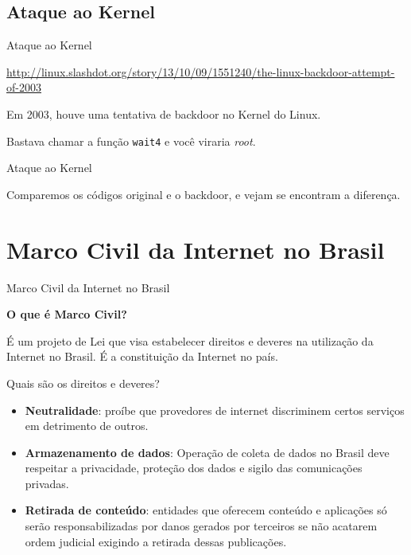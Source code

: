 \begin{frame}


\end{frame}

\subsection{Ataque ao Kernel}\label{ataque-ao-kernel}

\begin{frame}{Ataque ao Kernel}

\url{http://linux.slashdot.org/story/13/10/09/1551240/the-linux-backdoor-attempt-of-2003}

Em 2003, houve uma tentativa de backdoor no Kernel do Linux.


Bastava chamar a função \texttt{wait4} e você viraria \emph{root}.

\end{frame}

\begin{frame}{Ataque ao Kernel}

Comparemos os códigos original e o backdoor, e vejam se encontram a
diferença.



\end{frame}

\section{Marco Civil da Internet no
Brasil}\label{marco-civil-da-internet-no-brasil}

\begin{frame}{Marco Civil da Internet no Brasil}

\textbf{O que é Marco Civil?}

É um projeto de Lei que visa estabelecer direitos e deveres na
utilização da Internet no Brasil. É a constituição da Internet no país.

\end{frame}

\begin{frame}{Quais são os direitos e deveres?}

\begin{itemize}
\itemsep1pt\parskip0pt
\item
  \textbf{Neutralidade}: proíbe que provedores de internet discriminem
  certos serviços em detrimento de outros.
\item
  \textbf{Armazenamento de dados}: Operação de coleta de dados no Brasil
  deve respeitar a privacidade, proteção dos dados e sigilo das
  comunicações privadas.
\item
  \textbf{Retirada de conteúdo}: entidades que oferecem conteúdo e
  aplicações só serão responsabilizadas por danos gerados por terceiros
  se não acatarem ordem judicial exigindo a retirada dessas publicações.
\end{itemize}

\end{frame}

